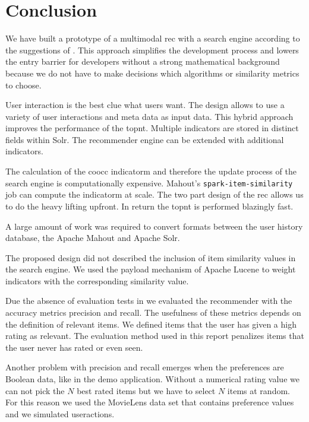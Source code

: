 \section{Conclusion}
\label{sec:conclusion}

We have built a prototype of a \gls{multimodal} \gls{rec} with a search engine according to the suggestions of \cite{Dunning14}. 
This approach simplifies the development process and lowers the entry barrier for developers without a strong mathematical background because we do not have to make decisions which algorithms or similarity metrics to choose. 

User interaction is the best clue what users want.
The design allows to use a variety of user interactions and meta data as input data. This hybrid approach improves the performance of the \gls{topnt}. Multiple \glspl{indicator} are stored in distinct fields within Solr. The recommender engine can be extended with additional \glspl{indicator}.

The calculation of the \gls{coocc} \gls{indicatorm} and therefore the update process of the search engine is computationally expensive. Mahout's \verb|spark-item-similarity| job can compute the \gls{indicatorm} at scale.
The two part design of the \gls{rec} allows us to do the heavy lifting upfront. In return the \gls{topnt} is performed blazingly fast.

A large amount of work was required to convert formats between the user history database, the Apache Mahout and Apache Solr. 

The proposed design did not described the inclusion of item similarity values in the search engine. We used the payload mechanism of Apache Lucene to weight indicators with the corresponding similarity value.

Due the absence of evaluation tests in \cite{Dunning14} we evaluated the recommender with the accuracy metrics \gls{precision} and \gls{recall}. The usefulness of these metrics depends on the definition of relevant items. We defined items that the user has given a high rating as relevant. The evaluation method used in this report penalizes items that the user never has rated or even seen. 

Another problem with precision and recall emerges when the \glspl{preference} are Boolean data, like in the demo application. Without a numerical rating value we can not pick the $N$ best rated items but we have to select $N$ items at random. For this reason we used the MovieLens data set that contains preference values and we simulated \glspl{useraction}.

